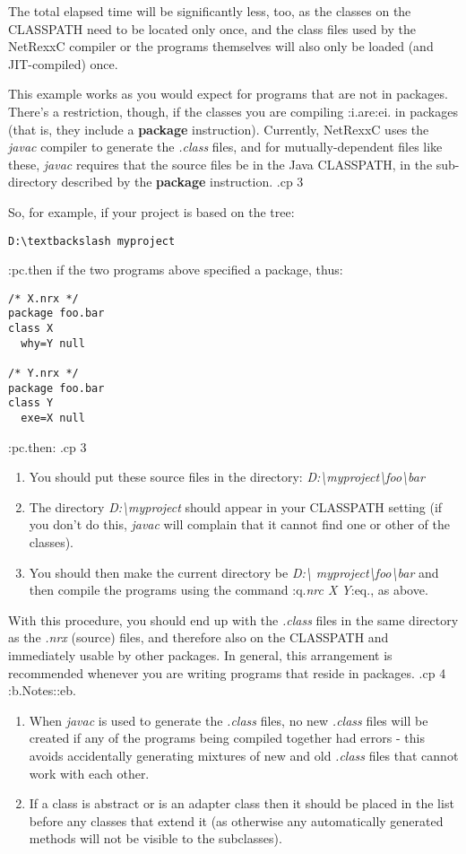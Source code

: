 The total elapsed time will be significantly less, too, as the classes
on the CLASSPATH need to be located only once, and the class files used
by the NetRexxC compiler or the programs themselves will also only be
loaded (and JIT-compiled) once.

This example works as you would expect for programs that are not in
packages.  There's a restriction, though, if the classes you are
compiling :i.are:ei. in packages (that is, they include a
\textbf{package} instruction).  Currently, NetRexxC uses the \emph{javac}
compiler to generate the \emph{.class} files, and for mutually-dependent
files like these, \emph{javac} requires that the source files be in the
Java CLASSPATH, in the sub-directory described by the \textbf{package}
instruction.
.cp 3

So, for example, if your project is based on the tree:
\begin{verbatim}
D:\textbackslash myproject
\end{verbatim}
:pc.then if the two programs above specified a package, thus:
\begin{verbatim}
/* X.nrx */
package foo.bar
class X
  why=Y null

/* Y.nrx */
package foo.bar
class Y
  exe=X null
\end{verbatim}
:pc.then:
.cp 3
\begin{enumerate}
\item
You should put these source files in the directory:
\emph{D:\textbackslash myproject\textbackslash foo\textbackslash bar}
\item
The directory \emph{D:\textbackslash myproject} should appear in your CLASSPATH
setting (if you don't do this, \emph{javac} will complain that it cannot
find one or other of the classes).
\item
You should then make the current directory be \emph{D:\textbackslash
myproject\textbackslash foo\textbackslash bar}
and then compile the programs using the command :q.\emph{nrc X Y}:eq.,
as above.
\end{enumerate}

With this procedure, you should end up with the \emph{.class} files in
the same directory as the \emph{.nrx} (source) files, and therefore also
on the CLASSPATH and immediately usable by other packages.  In general,
this arrangement is recommended whenever you are writing programs that
reside in packages.
.cp 4
:b.Notes::eb.
\begin{enumerate}
\item
When \emph{javac} is used to generate the \emph{.class} files, no
new \emph{.class} files will be created if any of the programs being
compiled together had errors - this avoids accidentally generating
mixtures of new and old \emph{.class} files that cannot work with each
other.
\item
If a class is abstract or is an adapter class then it should be placed
in the list before any classes that extend it (as otherwise any
automatically generated methods will not be visible to the subclasses).
\end{enumerate}

